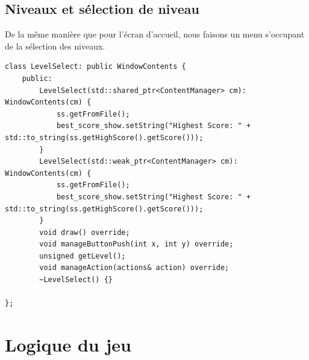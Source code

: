 \documentclass[a4paper, 12pt]{article}
\begin{document}
\subsection{Niveaux et sélection de niveau}

De la même manière que pour l'écran d'accueil, 
nous faisons un menu s'occupant de la sélection des niveaux.
\begin{lstlisting}
class LevelSelect: public WindowContents {
    public:
        LevelSelect(std::shared_ptr<ContentManager> cm): WindowContents(cm) {
            ss.getFromFile();
            best_score_show.setString("Highest Score: " + std::to_string(ss.getHighScore().getScore()));
        }
        LevelSelect(std::weak_ptr<ContentManager> cm): WindowContents(cm) {
            ss.getFromFile();
            best_score_show.setString("Highest Score: " + std::to_string(ss.getHighScore().getScore()));
        }
        void draw() override;
        void manageButtonPush(int x, int y) override;
        unsigned getLevel();
        void manageAction(actions& action) override;
        ~LevelSelect() {}

};
\end{lstlisting}

\section{Logique du jeu}

\end{document}
